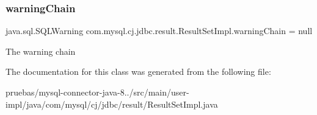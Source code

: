 \subsubsection{\texorpdfstring{warning\+Chain}{warningChain}}
{\footnotesize\ttfamily java.\+sql.\+S\+Q\+L\+Warning com.\+mysql.\+cj.\+jdbc.\+result.\+Result\+Set\+Impl.\+warning\+Chain = null\hspace{0.3cm}{\ttfamily [protected]}}

The warning chain 

The documentation for this class was generated from the following file\+:\begin{DoxyCompactItemize}
\item 
pruebas/mysql-\/connector-\/java-\/8../src/main/user-\/impl/java/com/mysql/cj/jdbc/result/Result\+Set\+Impl.\+java\end{DoxyCompactItemize}
